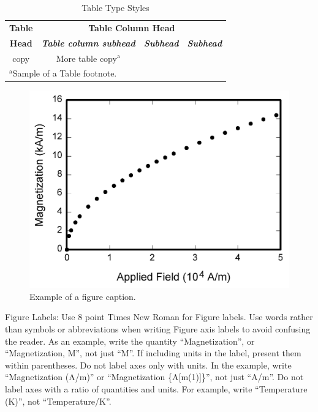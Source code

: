 \documentclass[conference]{IEEEtran}
\begin{document}
\begin{table}[htbp]
\caption{Table Type Styles}
\begin{center}
\begin{tabular}{|c|c|c|c|}
\hline
\textbf{Table}&\multicolumn{3}{|c|}{\textbf{Table Column Head}} \\
\cline{2-4} 
\textbf{Head} & \textbf{\textit{Table column subhead}}& \textbf{\textit{Subhead}}& \textbf{\textit{Subhead}} \\
\hline
copy& More table copy$^{\mathrm{a}}$& &  \\
\hline
\multicolumn{4}{l}{$^{\mathrm{a}}$Sample of a Table footnote.}
\end{tabular}
\label{tab1}
\end{center}
\end{table}

\begin{figure}[htbp]
\centerline{\includegraphics{fig1.png}}
\caption{Example of a figure caption.}
\label{fig}
\end{figure}

Figure Labels: Use 8 point Times New Roman for Figure labels. Use words 
rather than symbols or abbreviations when writing Figure axis labels to 
avoid confusing the reader. As an example, write the quantity 
``Magnetization'', or ``Magnetization, M'', not just ``M''. If including 
units in the label, present them within parentheses. Do not label axes only 
with units. In the example, write ``Magnetization (A/m)'' or ``Magnetization 
\{A[m(1)]\}'', not just ``A/m''. Do not label axes with a ratio of 
quantities and units. For example, write ``Temperature (K)'', not 
``Temperature/K''.
\end{document}
